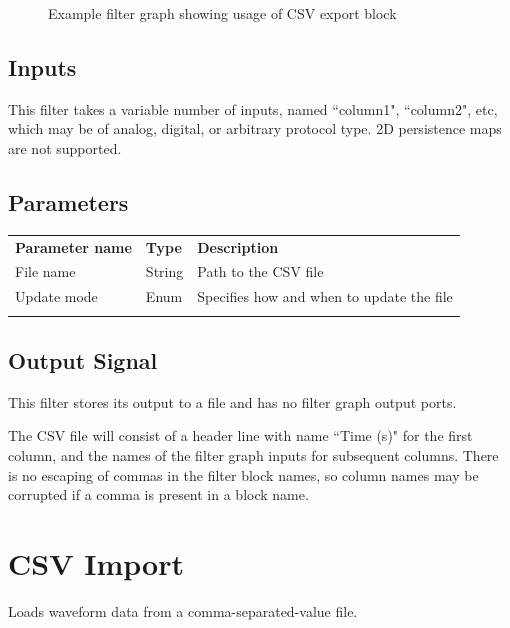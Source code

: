 \begin{figure}[h]
\centering
{}
\caption{Example filter graph showing usage of CSV export block}
\label{filter_graph_csv_export}
\end{figure}

\subsection{Inputs}

This filter takes a variable number of inputs, named ``column1", ``column2", etc, which may be of analog, digital, or
arbitrary protocol type. 2D persistence maps are not supported.

\subsection{Parameters}

\begin{tabularx}{16cm}{llX}
\thickhline
\textbf{Parameter name} & \textbf{Type} & \textbf{Description} \\
\thickhline
File name & String & Path to the CSV file\\
\thinhline
Update mode & Enum & Specifies how and when to update the file\\
\thickhline
\end{tabularx}

\subsection{Output Signal}

This filter stores its output to a file and has no filter graph output ports.

The CSV file will consist of a header line with name ``Time (s)" for the first column, and the names of the filter
graph inputs for subsequent columns. There is no escaping of commas in the filter block names, so column names may be
corrupted if a comma is present in a block name.

\pagebreak
\section{CSV Import}

Loads waveform data from a comma-separated-value file.

